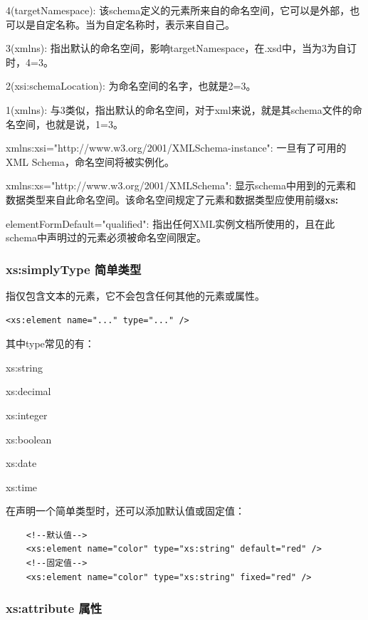 \documentclass[fontset=windows]{article}
\begin{document}
4(targetNamespace): 该schema定义的元素所来自的命名空间，它可以是外部，也可以是自定名称。当为自定名称时，表示来自自己。

3(xmlns): 指出默认的命名空间，影响targetNamespace，在.xsd中，当为3为自订时，4=3。

2(xsi:schemaLocation): 为命名空间的名字，也就是2=3。

1(xmlns): 与3类似，指出默认的命名空间，对于xml来说，就是其schema文件的命名空间，也就是说，1=3。

xmlns:xsi="http://www.w3.org/2001/XMLSchema-instance": 一旦有了可用的XML Schema，命名空间将被实例化。

xmlns:xs="http://www.w3.org/2001/XMLSchema": 显示schema中用到的元素和数据类型来自此命名空间。该命名空间规定了元素和数据类型应使用前缀\textbf{xs:}

elementFormDefault="qualified": 指出任何XML实例文档所使用的，且在此schema中声明过的元素必须被命名空间限定。

\subsubsection{xs:simplyType 简单类型}

指仅包含文本的元素，它不会包含任何其他的元素或属性。

\begin{verbatim}
<xs:element name="..." type="..." />	
\end{verbatim}

其中type常见的有：

\indent\indent xs:string

\indent\indent xs:decimal

\indent\indent xs:integer

\indent\indent xs:boolean

\indent\indent xs:date

\indent\indent xs:time

在声明一个简单类型时，还可以添加默认值或固定值：

\begin{verbatim}
	<!--默认值-->
	<xs:element name="color" type="xs:string" default="red" />
	<!--固定值-->
	<xs:element name="color" type="xs:string" fixed="red" />
\end{verbatim}

\subsubsection{xs:attribute 属性}
\end{document}
